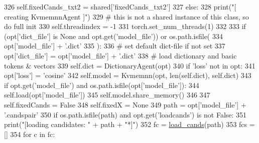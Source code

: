\begin{DoxyCode}
326                 self.fixedCands\_txt2 = shared[\textcolor{stringliteral}{'fixedCands\_txt2'}]
327         \textcolor{keywordflow}{else}:
328             print(\textcolor{stringliteral}{"[ creating KvmemnnAgent ]"})
329             \textcolor{comment}{# this is not a shared instance of this class, so do full init}
330             self.threadindex = -1
331             torch.set\_num\_threads(1)
332 
333             \textcolor{keywordflow}{if} (opt[\textcolor{stringliteral}{'dict\_file'}] \textcolor{keywordflow}{is} \textcolor{keywordtype}{None} \textcolor{keywordflow}{and} opt.get(\textcolor{stringliteral}{'model\_file'})) \textcolor{keywordflow}{or} os.path.isfile(
334                 opt[\textcolor{stringliteral}{'model\_file'}] + \textcolor{stringliteral}{'.dict'}
335             ):
336                 \textcolor{comment}{# set default dict-file if not set}
337                 opt[\textcolor{stringliteral}{'dict\_file'}] = opt[\textcolor{stringliteral}{'model\_file'}] + \textcolor{stringliteral}{'.dict'}
338             \textcolor{comment}{# load dictionary and basic tokens & vectors}
339             self.dict = DictionaryAgent(opt)
340             \textcolor{keywordflow}{if} \textcolor{stringliteral}{'loss'} \textcolor{keywordflow}{not} \textcolor{keywordflow}{in} opt:
341                 opt[\textcolor{stringliteral}{'loss'}] = \textcolor{stringliteral}{'cosine'}
342             self.model = Kvmemnn(opt, len(self.dict), self.dict)
343             \textcolor{keywordflow}{if} opt.get(\textcolor{stringliteral}{'model\_file'}) \textcolor{keywordflow}{and} os.path.isfile(opt[\textcolor{stringliteral}{'model\_file'}]):
344                 self.load(opt[\textcolor{stringliteral}{'model\_file'}])
345             self.model.share\_memory()
346 
347             self.fixedCands = \textcolor{keyword}{False}
348             self.fixedX = \textcolor{keywordtype}{None}
349             path = opt[\textcolor{stringliteral}{'model\_file'}] + \textcolor{stringliteral}{'.candspair'}
350             \textcolor{keywordflow}{if} os.path.isfile(path) \textcolor{keywordflow}{and} opt.get(\textcolor{stringliteral}{'loadcands'}) \textcolor{keywordflow}{is} \textcolor{keywordflow}{not} \textcolor{keyword}{False}:
351                 print(\textcolor{stringliteral}{"[loading candidates: "} + path + \textcolor{stringliteral}{"*]"})
352                 fc = \hyperlink{namespaceprojects_1_1personachat_1_1kvmemnn_1_1kvmemnn_a7f44d8ff34857c26b87223a668c43724}{load\_cands}(path)
353                 fcs = []
354                 \textcolor{keywordflow}{for} c \textcolor{keywordflow}{in} fc:

\end{DoxyCode}
